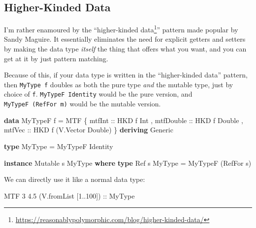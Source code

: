 \documentclass[]{article}
\newenvironment{Shaded}{}{}
\newcommand{\DataTypeTok}[1]{\textcolor[rgb]{0.56,0.13,0.00}{#1}}
\newcommand{\DecValTok}[1]{\textcolor[rgb]{0.25,0.63,0.44}{#1}}
\newcommand{\FloatTok}[1]{\textcolor[rgb]{0.25,0.63,0.44}{#1}}
\newcommand{\KeywordTok}[1]{\textcolor[rgb]{0.00,0.44,0.13}{\textbf{#1}}}
\newcommand{\NormalTok}[1]{#1}
\newcommand{\OperatorTok}[1]{\textcolor[rgb]{0.40,0.40,0.40}{#1}}
\newcommand{\OtherTok}[1]{\textcolor[rgb]{0.00,0.44,0.13}{#1}}
\renewcommand{\href}[2]{#2\footnote{\url{#1}}}
\begin{document}
\subsection{Higher-Kinded Data}\label{higher-kinded-data}

I'm rather enamoured by the
``\href{https://reasonablypolymorphic.com/blog/higher-kinded-data/}{higher-kinded
data}'' pattern made popular by Sandy Maguire. It essentially eliminates the
need for explicit getters and setters by making the data type \emph{itself} the
thing that offers what you want, and you can get at it by just pattern matching.

Because of this, if your data type is written in the ``higher-kinded data''
pattern, then \texttt{MyType\ f} doubles as both the pure type \emph{and} the
mutable type, just by choice of \texttt{f}. \texttt{MyTypeF\ Identity} would be
the pure version, and \texttt{MyTypeF\ (RefFor\ m)} would be the mutable
version.

\begin{Shaded}
\begin{Highlighting}[]
\KeywordTok{data} \DataTypeTok{MyTypeF}\NormalTok{ f }\OtherTok{=} \DataTypeTok{MTF}
\NormalTok{    \{}\OtherTok{ mtfInt    ::} \DataTypeTok{HKD}\NormalTok{ f }\DataTypeTok{Int}
\NormalTok{    ,}\OtherTok{ mtfDouble ::} \DataTypeTok{HKD}\NormalTok{ f }\DataTypeTok{Double}
\NormalTok{    ,}\OtherTok{ mtfVec    ::} \DataTypeTok{HKD}\NormalTok{ f (}\DataTypeTok{V.Vector} \DataTypeTok{Double}\NormalTok{)}
\NormalTok{    \}}
  \KeywordTok{deriving} \DataTypeTok{Generic}

\KeywordTok{type} \DataTypeTok{MyType\textquotesingle{}} \OtherTok{=} \DataTypeTok{MyTypeF} \DataTypeTok{Identity}

\KeywordTok{instance} \DataTypeTok{Mutable}\NormalTok{ s }\DataTypeTok{MyType\textquotesingle{}} \KeywordTok{where}
    \KeywordTok{type} \DataTypeTok{Ref}\NormalTok{ s }\DataTypeTok{MyType\textquotesingle{}} \OtherTok{=} \DataTypeTok{MyTypeF}\NormalTok{ (}\DataTypeTok{RefFor}\NormalTok{ s)}
\end{Highlighting}
\end{Shaded}

We can directly use it like a normal data type:

\begin{Shaded}
\begin{Highlighting}[]
\DataTypeTok{MTF} \DecValTok{3} \FloatTok{4.5}\NormalTok{ (V.fromList [}\DecValTok{1}\OperatorTok{..}\DecValTok{100}\NormalTok{])}
\OtherTok{    ::} \DataTypeTok{MyType\textquotesingle{}}
\end{Highlighting}
\end{Shaded}
\end{document}
